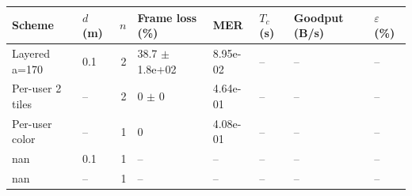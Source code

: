 \begin{tabular}{llrlllll}
\hline
Scheme & $d$ (m) & $n$ & Frame loss (\%) & MER & $T_c$ (s) & Goodput (B/s) & $\varepsilon$ (\%) \\
\hline
Layered a=170 & 0.1 & 2 & 38.7 $\pm$ 1.8e+02 & 8.95e-02 & -- & -- & -- \\
Per-user 2 tiles & -- & 2 & 0 $\pm$ 0 & 4.64e-01 & -- & -- & -- \\
Per-user color & -- & 1 & 0 & 4.08e-01 & -- & -- & -- \\
nan & 0.1 & 1 & -- & -- & -- & -- & -- \\
nan & -- & 1 & -- & -- & -- & -- & -- \\
\hline
\end{tabular}

